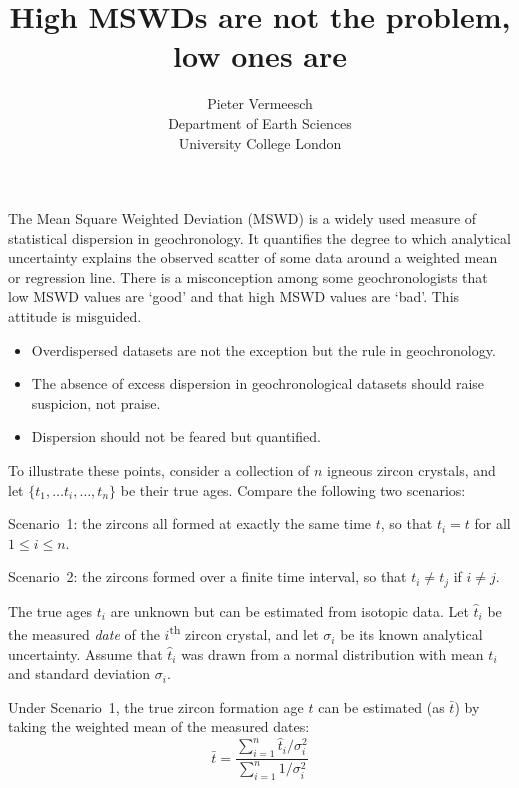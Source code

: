 \documentclass{article}
\title{High MSWDs are not the problem, low ones are\\}
\author{Pieter Vermeesch \\ Department of Earth Sciences \\ University College London}
\begin{document}
\maketitle

The Mean Square Weighted Deviation (MSWD) is a widely used measure of
statistical dispersion in geochronology.  It quantifies the degree to
which analytical uncertainty explains the observed scatter of some
data around a weighted mean or regression
line\cite{mcintyre1966}. There is a misconception among some
geochronologists that low MSWD values are `good' and that high MSWD
values are `bad'. This attitude is misguided.

\begin{itemize}
  \item Overdispersed datasets are not the exception but the rule in
    geochronology.
  \item The absence of excess dispersion in geochronological datasets
    should raise suspicion, not praise.
  \item Dispersion should not be feared but quantified.
\end{itemize}

To illustrate these points, consider a collection of $n$ igneous
zircon crystals, and let $\{t_1,\ldots{t_i},\ldots,t_n\}$ be their
true ages. Compare the following two scenarios:

\begin{description}
\item{Scenario~1}: the zircons all formed at exactly the same time
  $t$, so that $t_i=t$ for all $1\leq{i}\leq{n}$.
\item{Scenario~2}: the zircons formed over a finite time interval, so
  that ${t_i}\neq{t_j}$ if ${i}\neq{j}$.
\end{description}

The true ages $t_i$ are unknown but can be estimated from isotopic
data. Let $\hat{t}_i$ be the measured \emph{date} of the
$i$\textsuperscript{th} zircon crystal, and let $\sigma_i$ be its
known analytical uncertainty. Assume that $\hat{t}_i$ was drawn from a
normal distribution with mean $t_i$ and standard deviation $\sigma_i$.

Under Scenario~1, the true zircon formation age $t$ can be estimated
(as $\bar{t}$) by taking the weighted mean of the measured dates:
\begin{equation}
  \bar{t} = \frac{\sum_{i=1}^n\hat{t}_i/\sigma_i^2}{\sum_{i=1}^n1/\sigma_i^2}
  \label{eq:tbar}
\end{equation}
\end{document}
